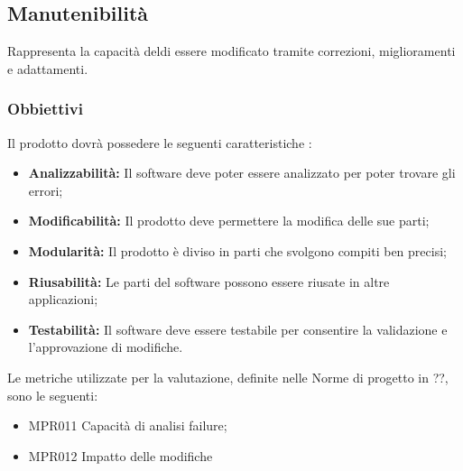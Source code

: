 \subsection{Manutenibilità}
Rappresenta la capacità deldi essere modificato tramite correzioni, miglioramenti e adattamenti.
\subsubsection{Obbiettivi } Il prodotto dovrà possedere le seguenti caratteristiche :
\begin{itemize}
	\item \textbf{Analizzabilità:} Il software deve poter essere analizzato per poter trovare gli errori;
	\item \textbf{Modificabilità:} Il prodotto deve permettere la modifica delle sue parti;
	\item \textbf{Modularità:} Il prodotto è diviso in parti che svolgono compiti ben precisi;
	\item \textbf{Riusabilità:} Le parti del software possono essere riusate in altre applicazioni;
	\item \textbf{Testabilità:} Il software deve essere testabile per consentire la validazione e l'approvazione di modifiche.
\end{itemize}	Le metriche utilizzate per la valutazione, definite nelle Norme di progetto in ??, sono le seguenti:
\begin{itemize}
	\item MPR011 Capacità di analisi failure;
	\item MPR012 Impatto delle modifiche
\end{itemize}

